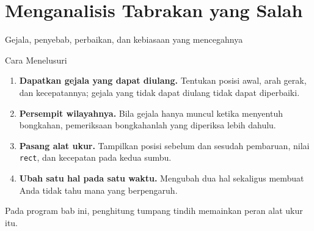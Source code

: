 \documentclass[aspectratio=169,10pt]{beamer}
\begin{document}
\section{Menganalisis Tabrakan yang Salah}
  {Gejala, penyebab, perbaikan, dan kebiasaan yang mencegahnya}

\begin{frame}{Cara Menelusuri}
\begin{enumerate}
  \item \textbf{Dapatkan gejala yang dapat diulang.} Tentukan posisi awal, arah
        gerak, dan kecepatannya; gejala yang tidak dapat diulang tidak dapat
        diperbaiki.
  \item \textbf{Persempit wilayahnya.} Bila gejala hanya muncul ketika
        menyentuh bongkahan, pemeriksaan bongkahanlah yang diperiksa lebih
        dahulu.
  \item \textbf{Pasang alat ukur.} Tampilkan posisi sebelum dan sesudah
        pembaruan, nilai \texttt{rect}, dan kecepatan pada kedua sumbu.
  \item \textbf{Ubah satu hal pada satu waktu.} Mengubah dua hal sekaligus
        membuat Anda tidak tahu mana yang berpengaruh.
\end{enumerate}
\vspace{0.12cm}
\begin{kotak}
Pada program bab ini, penghitung tumpang tindih memainkan peran alat ukur itu.
\end{kotak}
\end{frame}
\end{document}

